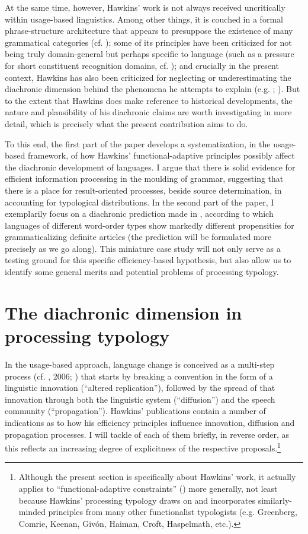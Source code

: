 \documentclass[output=paper]{langsci/langscibook}
\begin{document}
At the same time, however, Hawkins’ work is not always received uncritically within usage-based linguistics. Among other things, it is couched in a formal phrase-structure architecture that appears to presuppose the existence of many grammatical categories (cf. \citealt{Diessel2016}); some of its principles have been criticized for not being truly domain-general but perhaps specific to language (such as a pressure for short constituent recognition domains, cf. \citealt{Bybee2010}); and crucially in the present context, Hawkins has also been criticized for neglecting or underestimating the diachronic dimension behind the phenomena he attempts to explain (e.g. \citealt{Cristofaro2017}; ). But to the extent that Hawkins does make reference to historical developments, the nature and plausibility of his diachronic claims are worth investigating in more detail, which is precisely what the present contribution aims to do. 

To this end, the first part of the paper develops a systematization, in the usage-based framework, of how Hawkins’ functional-adaptive principles possibly affect the diachronic development of languages. I argue that there is solid evidence for efficient information processing in the moulding of grammar, suggesting that there is a place for result-oriented processes, beside source determination, in accounting for typological distributions. In the second part of the paper, I exemplarily focus on a diachronic prediction made in \citet{Hawkins2014}, according to which languages of different word-order types show markedly different propensities for grammaticalizing definite articles (the prediction will be formulated more precisely as we go along). This miniature case study will not only serve as a testing ground for this specific efficiency-based hypothesis, but also allow us to identify some general merits and potential problems of processing typology.

\section{ The diachronic dimension in processing typology} 

In the usage-based approach, language change is conceived as a multi-step process (cf. \citealt{Croft2000}, 2006; \citealt{Aitchison2013}) that starts by breaking a convention in the form of a linguistic innovation (“altered replication”), followed by the spread of that innovation through both the linguistic system (“diffusion”) and the speech community (“propagation”). Hawkins’ publications contain a number of indications as to how his efficiency principles influence innovation, diffusion and propagation processes. I will tackle of each of them briefly, in reverse order, as this reflects an increasing degree of explicitness of the respective proposals.\footnote{Although the present section is specifically about Hawkins’ work, it actually applies to “functional-adaptive constraints” () more generally, not least because Hawkins’ processing typology draws on and incorporates similarly-minded principles from many other functionalist typologists (e.g. Greenberg, Comrie, Keenan, Givón, Haiman, Croft, Haspelmath, etc.).}
\end{document}

